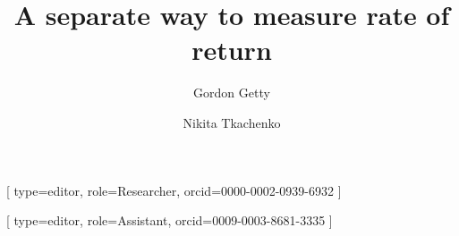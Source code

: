 \documentclass[a4paper,fleqn]{cas-sc}
\begin{document}
\let\WriteBookmarks\relax
\def\floatpagepagefraction{1}
\def\textpagefraction{.001}



\title [mode = title]{\textbf{A separate way to measure rate of return}}                      




%
\author[1]{Gordon Getty}[
                        type=editor,
                        role=Researcher,
                        orcid=0000-0002-0939-6932
                        ]

\cormark[1]

\author[2]{Nikita Tkachenko}[
                    type=editor,
                    role=Assistant,
                    orcid=0009-0003-8681-3335
]







\end{document}
